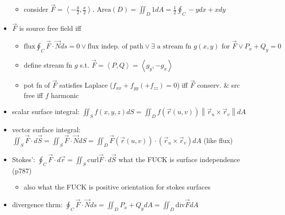 \documentclass[11pt]{article}
\theoremstyle{definition}
\newcommand{\magn}[1]{\left\lVert #1 \right\rVert}
\begin{document}
\begin{itemize}
\begin{itemize}
    \item consider $\vec{F}=\left<-\frac{y}{2},\frac{x}{2}\right>$. $\text{Area}(D)=\iint_D1dA = \frac{1}{2}\oint_C -ydx+xdy$
  \end{itemize}
  \item $\vec{F}$ is source free field iff 
  \begin{itemize}
    \item $\text{flux} \oint_C\vec{F}\cdot\vec{N}ds = 0 \lor \text{flux indep. of path} \lor \exists\text{ a stream fn } g(x,y) \text{ for } \vec{F} \lor P_x+Q_y=0$
    \item define stream fn $g$ s.t. $\vec{F} = \left<P,Q\right> = \left<g_y,-g_x\right>$
    \item pot fn of $\vec{F}$ satisfies Laplace ($f_{xx}+f_{yy}(+f_{zz})=0$) iff $\vec{F}$ conserv. \& src free iff $f$ harmonic
  \end{itemize}
  \vspace*{-1em}
  \item scalar surface integral: $\iint_S f(x,y,z)dS = \iint_D f(\vec{r}(u,v))\magn{\vec{r}_u\times\vec{r}_v}dA$
  \item vector surface integral: $\iint_S \vec{F}\cdot d\vec{S} = \iint_S \vec{F}\cdot\vec{N}dS = \iint_D \vec{F}(\vec{r}(u,v))\cdot(\vec{r}_u \times\vec{r}_v) dA$ (like flux)
  \item Stokes': $\oint_C \vec{F}\cdot d\vec{r} = \iint_S \text{curl}\vec{F}\cdot d\vec{S}$ what the FUCK is surface independence (p787)
  \begin{itemize}
    \item also what the FUCK is positive orientation for stokes surfaces
  \end{itemize}
  \item divergence thrm: $\oint_C \vec{F}\cdot\vec{N}ds = \iint_D P_x+Q_ydA=\iint_D \text{div}\vec{F}dA$
  
  
  



\end{itemize}
\end{document}
